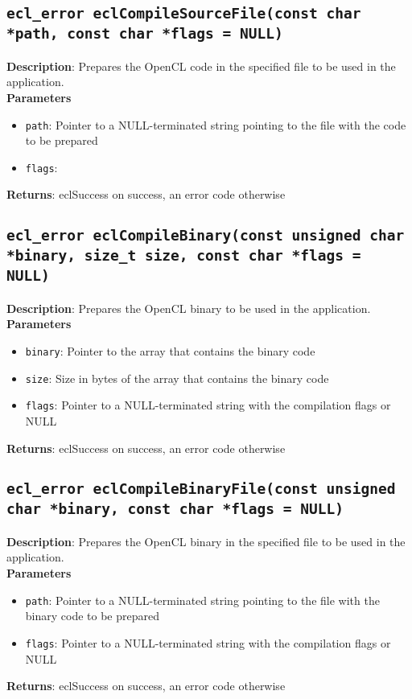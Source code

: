 \subsection{\texttt{ecl\_error eclCompileSourceFile(const char *path, const char *flags = NULL)}}

\textbf{Description}: Prepares the OpenCL code in the specified file to be used in the application.  \\
\textbf{Parameters}
\begin{itemize}
  \item \texttt{path}: Pointer to a NULL\hyp{}terminated string pointing to the file with the code 
 to be prepared
  \item \texttt{flags}: \end{itemize}
\textbf{Returns}: eclSuccess on success, an error code otherwise

\subsection{\texttt{ecl\_error eclCompileBinary(const unsigned char *binary, size\_t size, const char *flags = NULL)}}

\textbf{Description}: Prepares the OpenCL binary to be used in the application.  \\
\textbf{Parameters}
\begin{itemize}
  \item \texttt{binary}: Pointer to the array that contains the binary code
  \item \texttt{size}: Size in bytes of the array that contains the binary code
  \item \texttt{flags}: Pointer to a NULL\hyp{}terminated string with the compilation flags or 
NULL
\end{itemize}
\textbf{Returns}: eclSuccess on success, an error code otherwise

\subsection{\texttt{ecl\_error eclCompileBinaryFile(const unsigned char *binary, const char 
*flags = NULL)}}

\textbf{Description}: Prepares the OpenCL binary in the specified file to be used in the application.  \\
\textbf{Parameters}
\begin{itemize}
  \item \texttt{path}: Pointer to a NULL\hyp{}terminated string pointing to the file with the binary 
  code to be prepared
  \item \texttt{flags}: Pointer to a NULL\hyp{}terminated string with the compilation flags or NULL
\end{itemize}
\textbf{Returns}: eclSuccess on success, an error code otherwise

